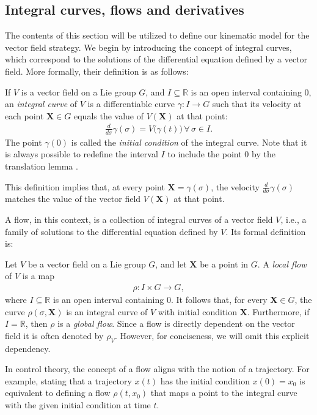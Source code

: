 \subsection{Integral curves, flows and derivatives}
The contents of this section will be utilized to define our kinematic model for the vector field strategy. We begin by introducing the concept of integral curves, which correspond to the solutions of the differential equation defined by a vector field. More formally, their definition is as follows:
\begin{definition}
    If $V$ is a vector field on a Lie group $G$, and $I\subseteq \mathbb{R}$ is an open interval containing $0$, an \emph{integral curve} of $V$ is a differentiable curve $\gamma:I\to G$ such that its velocity at each point $\mathbf{X}\in G$ equals the value of $V(\mathbf{X})$ at that point:
    \begin{align*}
        \frac{d}{d\sigma}\gamma(\sigma) = V\bigl(\gamma(t)\bigr)\,\forall\,\sigma\in I.
    \end{align*}
    The point $\gamma(0)$ is called the \emph{initial condition} of the integral curve. Note that it is always possible to redefine the interval $I$ to include the point $0$ by the translation lemma \citep[p. 208]{Lee2012}.
\end{definition}
This definition implies that, at every point $\mathbf{X}=\gamma(\sigma)$, the velocity $\frac{d}{d\sigma}\gamma(\sigma)$ matches the value of the vector field $V(\mathbf{X})$ at that point.

A flow, in this context, is a collection of integral curves of a vector field $V$, i.e., a family of solutions to the differential equation defined by $V$. Its formal definition is:
\begin{definition}
    Let $V$ be a vector field on a Lie group $G$, and let $\mathbf{X}$ be a point in $G$. A \emph{local flow} of $V$ is a map
    \begin{align*}
        \rho : I \times G \to G,
    \end{align*}
    where $I\subseteq\mathbb{R}$ is an open interval containing $0$. It follows that, for every $\mathbf{X}\in G$, the curve $\rho(\sigma, \mathbf{X})$ is an integral curve of $V$ with initial condition $\mathbf{X}$. Furthermore, if $I=\mathbb{R}$, then $\rho$ is a \emph{global flow}. Since a flow is directly dependent on the vector field it is often denoted by $\rho_V$. However, for conciseness, we will omit this explicit dependency.
\end{definition}
In control theory, the concept of a flow aligns with the notion of a trajectory. For example, stating that a trajectory $x(t)$ has the initial condition $x(0)=x_0$ is equivalent to defining a flow $\rho(t, x_0)$ that maps a point to the integral curve with the given initial condition at time $t$. 

